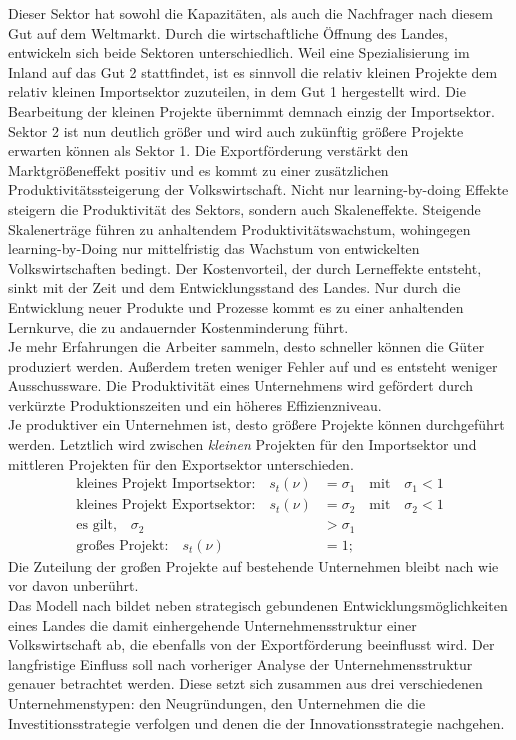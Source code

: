 Dieser Sektor hat sowohl die Kapazitäten, als auch die Nachfrager nach diesem Gut auf dem Weltmarkt. Durch die wirtschaftliche Öffnung des Landes, entwickeln sich beide Sektoren unterschiedlich. Weil eine Spezialisierung im Inland auf das Gut 2 stattfindet, ist es sinnvoll die relativ kleinen Projekte dem relativ kleinen Importsektor zuzuteilen, in dem Gut 1 hergestellt wird. Die Bearbeitung der kleinen Projekte übernimmt demnach einzig der Importsektor.\\
%
Sektor 2 ist nun deutlich größer und wird auch zukünftig größere Projekte erwarten können als Sektor 1. Die Exportförderung verstärkt den Marktgrößeneffekt positiv und es kommt zu einer zusätzlichen Produktivitätssteigerung der Volkswirtschaft.  Nicht nur learning-by-doing Effekte steigern die Produktivität des Sektors, sondern auch Skaleneffekte. Steigende Skalenerträge führen zu anhaltendem Produktivitätswachstum, wohingegen learning-by-Doing nur mittelfristig das Wachstum von entwickelten Volkswirtschaften bedingt. Der Kostenvorteil, der durch Lerneffekte entsteht, sinkt mit der Zeit und dem Entwicklungsstand des Landes. Nur durch die Entwicklung neuer Produkte und Prozesse kommt es zu einer anhaltenden Lernkurve, die zu andauernder Kostenminderung führt.\\ 
%
Je mehr Erfahrungen die Arbeiter sammeln, desto schneller können die Güter produziert werden. Außerdem treten weniger Fehler auf und es entsteht weniger Ausschussware. Die Produktivität eines Unternehmens wird gefördert durch verkürzte  Produktionszeiten und ein höheres Effizienzniveau.\\
%
Je produktiver ein Unternehmen ist, desto größere Projekte können durchgeführt werden. Letztlich wird zwischen \textit{kleinen} Projekten für den Importsektor und mittleren Projekten für den Exportsektor unterschieden.
%
	\begin{align*}
		\text{kleines Projekt Importsektor:}\quad s_t(\nu) &= \sigma_1 \quad\text{mit}\quad\sigma_1 < 1\\
		\text{kleines Projekt Exportsektor:} \quad s_t(\nu) &= \sigma_2 \quad\text{mit}\quad\sigma_2 < 1\\
		\text{es gilt,} \quad \sigma_2&>\sigma_1\\
		\text{großes Projekt:} \quad s_t(\nu) &= 1;
	\end{align*}
%
Die Zuteilung der großen Projekte auf bestehende Unternehmen bleibt nach wie vor davon unberührt. \\
Das Modell nach \cite{Acemoglu.2006} bildet neben strategisch gebundenen Entwicklungsmöglichkeiten eines Landes die damit einhergehende Unternehmensstruktur einer Volkswirtschaft ab, die ebenfalls von der Exportförderung beeinflusst wird. Der langfristige Einfluss soll nach vorheriger Analyse der Unternehmensstruktur genauer betrachtet werden. Diese setzt sich zusammen aus drei verschiedenen Unternehmenstypen: den Neugründungen, den Unternehmen die die Investitionsstrategie verfolgen und denen die der Innovationsstrategie nachgehen.\\ 
